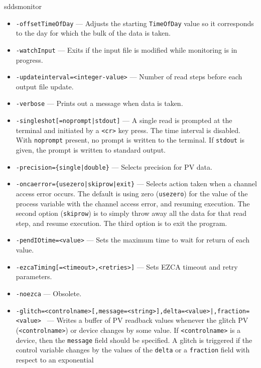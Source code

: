 \begin{sddsprog}{sddsmonitor}
\begin{itemize}
  \item {\tt -offsetTimeOfDay} --- Adjusts the starting \verb+TimeOfDay+ value so it corresponds
                to the day for which the bulk of the data is taken.
  \item {\tt -watchInput} --- Exits if the input file is modified while monitoring is in progress.
  \item {\tt -updateinterval=<integer-value>} --- Number of read steps before each output file update.
  \item {\tt -verbose} --- Prints out a message when data is taken.
  \item {\verb+-singleshot[=noprompt|stdout]+} --- A single read is prompted at the terminal
                and initiated by a \verb+<cr>+ key press. The time interval is disabled.
                With \verb+noprompt+ present, no prompt is written to the terminal. If \verb+stdout+
                is given, the prompt is written to standard output.
  \item {\verb+-precision={single|double}+} --- Selects precision for PV data.
  \item {\verb+-oncaerror={usezero|skiprow|exit}+} --- Selects action taken when a channel access error occurs.
                The default is using zero (\verb+usezero+) for the value of the process variable
                with the channel access error, and resuming execution. The second option (\verb+skiprow+) is to
                simply throw away all the data for that read step, and resume execution.
                The third option is to exit the program.
  \item {\tt -pendIOtime=<value>} --- Sets the maximum time to wait for return of each value.
  \item {\tt -ezcaTiming[=<timeout>,<retries>]} --- Sets EZCA timeout and retry parameters.
  \item {\tt -noezca} --- Obsolete.
  \item {\tt -glitch=<controlname>[,message=<string>]{,delta=<value>|,fraction=<value>} \newline
[,before=<number>][,after=<number>][,{baseline=<number>|filterFraction=<value>}][,sign={+|-}][,noReset][,{autoHoldoff|holdoff=<seconds>}]} ---
                Writes a buffer of PV readback values whenever the glitch PV (\verb+<controlname>+) or
                device changes by some value. If \verb+<controlname>+ is a device, then the \verb+message+ field
                should be specified. A glitch is triggered if the control
                variable changes by the values of the \verb+delta+ or a \verb+fraction+ field with respect to an exponential

\end{itemize}
\end{sddsprog}
